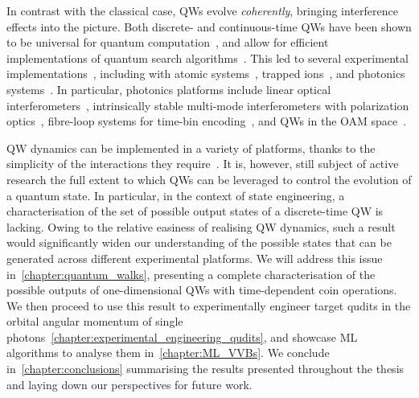 In contrast with the classical case, QWs evolve \textit{coherently}, bringing interference effects into the picture.
Both discrete- and continuous-time \acp{QW}  have been shown to be universal for quantum computation~\cite{childs2009universal,childs2013universal},
and allow for efficient implementations of quantum search algorithms~\cite{shenvi2003quantum,ambainis2005coins,tulsi2008faster}.
This led to several experimental implementations~\cite{manouchehri2014physical}, including with atomic systems~\cite{cote2006quantum,schwartz2007transport,chandrashekar2008quantum,perets2008realization,weitenberg2011singlespin,giuseppe2013einsteinpodolskyrosen,fukuhara2013microscopic,meinert2014observation,preiss2015strongly}, trapped ions~\cite{karski2009quantum,schmitz2009quantum,zhringer2010realization}, and photonics systems~\cite{peruzzo2010quantum,rohde2011multi,owens2011twophoton,poulios2014quantum,chapman2016experimental,caruso2016fast}.
In particular, photonics platforms include linear optical interferometers~\cite{sansoni2012twoparticle,crespi2013anderson,harris2015bosonic,pitsios2016photonic}, intrinsically stable multi-mode interferometers with polarization optics~\cite{broome2010discrete,kitagawa2012observation,vitelli2013joining}, fibre-loop systems for time-bin encoding~\cite{schreiber2010photons,schreiber2012a,boutari2016large}, and \acp{QW} in the \ac{OAM} space~\cite{cardano2015quantum,cardano2016statistical}.

QW dynamics can be implemented in a variety of platforms, thanks to the simplicity of the interactions they require~\cite{manouchehri2014physical}.
It is, however, still subject of active research the full extent to which QWs can be leveraged to control the evolution of a quantum state. In particular, in the context of state engineering, a characterisation of the set of possible output states of a discrete-time QW is lacking.
Owing to the relative easiness of realising QW dynamics, such a result would significantly widen our understanding of the possible states that can be generated across different experimental platforms.
We will address this issue in~\cref{chapter:quantum_walks}, presenting a complete characterisation of the possible outputs of one-dimensional QWs with time-dependent coin operations.
We then proceed to use this result to experimentally engineer target qudits in the orbital angular momentum of single photons~\cref{chapter:experimental_engineering_qudits}, and showcase ML algorithms to analyse them in~\cref{chapter:ML_VVBs}.
We conclude in~\cref{chapter:conclusions} summarising the results presented throughout the thesis and laying down our perspectives for future work.

